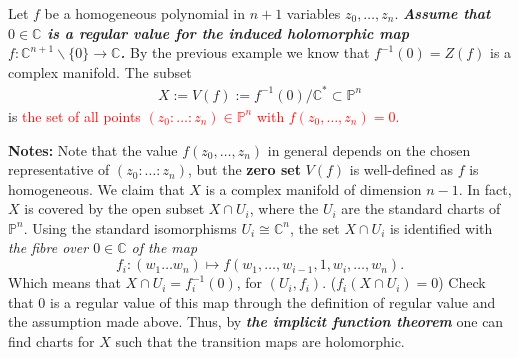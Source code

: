 Let $f$ be a homogeneous polynomial in $n+1$ variables $z_0, \ldots, z_n$. \textit{\textbf{Assume that $0 \in \mathbb{C}$ is a regular value for the induced holomorphic map $f: \mathbb{C}^{n+1} \backslash\{0\} \rightarrow \mathbb{C}$.}} By the previous example we know that $f^{-1}(0)=Z(f)$ is a complex manifold. The subset
\begin{align*}
X:=V(f):=f^{-1}(0) / \mathbb{C}^* \subset \mathbb{P}^n
\end{align*}
is \textcolor{red}{the set of all points $\left(z_0: \ldots: z_n\right) \in \mathbb{P}^n$ with $f\left(z_0, \ldots, z_n\right)=0$. }
\begin{key}{\bfseries Notes:}
Note that the value $f\left(z_0, \ldots, z_n\right)$ in general depends on the chosen representative of $\left(z_0: \ldots: z_n\right)$, but the \textbf{zero set} $V(f)$ is well-defined as $f$ is homogeneous. We claim that $X$ is a complex manifold of dimension $n-1$. In fact, $X$ is covered by the open subset $X \cap U_i$, where the $U_i$ are the standard charts of $\mathbb{P}^n$. Using the standard isomorphisms $U_i \cong \mathbb{C}^n$, the set $X \cap U_i$ is identified with \textit{the fibre over $0 \in \mathbb{C}$ of the map }
\[f_i:\left(w_1 \ldots w_n\right) \mapsto f\left(w_1, \ldots, w_{i-1}, 1, w_i, \ldots, w_n\right). \]
Which means that $X\cap U_i=f_i^{-1}(0)$, for $(U_i,f_i)$. ($f_i (X\cap U_i)=0$)
Check that 0 is a regular value of this map through the definition of regular value and the assumption made above. Thus, by \textit{\textbf{the implicit function theorem}} one can find charts for $X$ such that the transition maps are holomorphic.
\end{key}
































